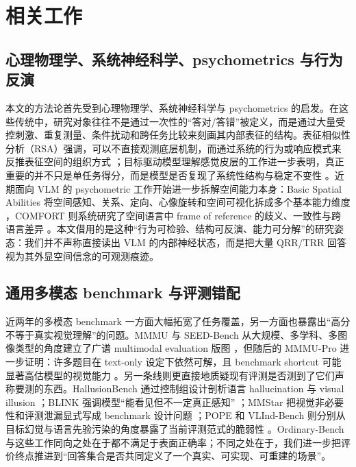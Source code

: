 \section{相关工作}

\subsection{心理物理学、系统神经科学、psychometrics 与行为反演}

本文的方法论首先受到心理物理学、系统神经科学与 psychometrics 的启发。在这些传统中，研究对象往往不是通过一次性的“答对/答错”被定义，而是通过大量受控刺激、重复测量、条件扰动和跨任务比较来刻画其内部表征的结构。表征相似性分析（RSA）强调，可以不直接观测底层机制，而通过系统的行为或响应模式来反推表征空间的组织方式 \cite{kriegeskorte2008rsa}；目标驱动模型理解感觉皮层的工作进一步表明，真正重要的并不只是单任务得分，而是模型是否复现了系统性结构与稳定不变性 \cite{yamins2016dicarlo}。近期面向 VLM 的 psychometric 工作开始进一步拆解空间能力本身：Basic Spatial Abilities 将空间感知、关系、定向、心像旋转和空间可视化拆成多个基本能力维度 \cite{xu2025bsa}，COMFORT 则系统研究了空间语言中 frame of reference 的歧义、一致性与跨语言差异 \cite{zhang2025comfort}。本文借用的是这种“行为可检验、结构可反演、能力可分解”的研究姿态：我们并不声称直接读出 VLM 的内部神经状态，而是把大量 QRR/TRR 回答视为其外显空间信念的可观测痕迹。

\subsection{通用多模态 benchmark 与评测错配}

近两年的多模态 benchmark 一方面大幅拓宽了任务覆盖，另一方面也暴露出“高分不等于真实视觉理解”的问题。MMMU 与 SEED-Bench 从大规模、多学科、多图像类型的角度建立了广谱 multimodal evaluation 版图 \cite{yue2024mmmu,li2024seedbench}，但随后的 MMMU-Pro 进一步证明：许多题目在 text-only 设定下依然可解，且 benchmark shortcut 可能显著高估模型的视觉能力 \cite{yue2025mmmupro}。另一条线则更直接地质疑现有评测是否测到了它们声称要测的东西。HallusionBench 通过控制组设计剖析语言 hallucination 与 visual illusion \cite{guan2024hallusionbench}；BLINK 强调模型“能看见但不一定真正感知” \cite{fu2024blink}；MMStar 把视觉非必要性和评测泄漏显式写成 benchmark 设计问题 \cite{chen2024mmstar}；POPE 和 VLInd-Bench 则分别从目标幻觉与语言先验污染的角度暴露了当前评测范式的脆弱性 \cite{li2023pope,lee2025vlind}。Ordinary-Bench 与这些工作同向之处在于都不满足于表面正确率；不同之处在于，我们进一步把评价终点推进到“回答集合是否共同定义了一个真实、可实现、可重建的场景”。

